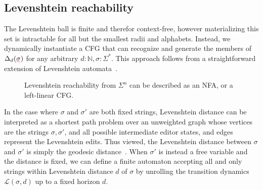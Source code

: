 \documentclass[sigplan,review,anonymous,acmsmall]{acmart}\settopmatter{printfolios=false,printccs=false,printacmref=false}
\begin{document}
\subsection{Levenshtein reachability}\label{sec:levenshtein}

%
%

The Levenshtein ball is finite and therefor context-free, however materializing this set is intractable for all but the smallest radii and alphabets. Instead, we dynamically instantiate a CFG that can recognize and generate the members of $\Delta_d(\err{\sigma})$ for any arbitrary $d: \mathbb{N}, \sigma: \Sigma^*$. This approach follows from a straightforward extension of Levenshtein automata~\cite{schulz2002fast}.

\begin{figure}
  \vspace{-5pt}
  \resizebox{.5\textwidth}{!}{}
  \caption{Levenshtein reachability from $\Sigma^n$ can be described as an NFA, or a left-linear CFG.}
\end{figure}

In the case where $\sigma$ and $\sigma'$ are both fixed strings, Levenshtein distance can be interpreted as a shortest path problem over an unweighted graph whose vertices are the strings $\sigma, \sigma'$, and all possible intermediate editor states, and edges represent the Levenshtein edits. Thus viewed, the Levenshtein distance between $\sigma$ and $\sigma'$ is simply the geodesic distance~\cite{ruth2023levenshtein}. When $\sigma'$ is instead a free variable and the distance is fixed, we can define a finite automaton accepting all and only strings within Levenshtein distance $d$ of $\sigma$ by unrolling the transition dynamics $\mathcal{L}(\sigma, d)$ up to a fixed horizon $d$.
\end{document}
